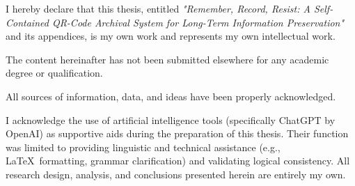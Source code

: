 \documentclass[main]{subfiles}
\begin{document}

\begin{originalitylong}
I hereby declare that this thesis, entitled \textit{"Remember, Record, Resist: A Self-Contained QR-Code Archival System for Long-Term Information Preservation"} and its appendices, is my own work and represents my own intellectual work.

The content hereinafter has not been submitted elsewhere for any academic degree or qualification.

All sources of information, data, and ideas have been properly acknowledged.

I acknowledge the use of artificial intelligence tools (specifically ChatGPT by OpenAI) as supportive aids during the preparation of this thesis.
Their function was limited to providing linguistic and technical assistance (e.g., \LaTeX\ formatting, grammar clarification) and validating logical consistency.
All research design, analysis, and conclusions presented herein are entirely my own.
\end{originalitylong}
\end{document}
